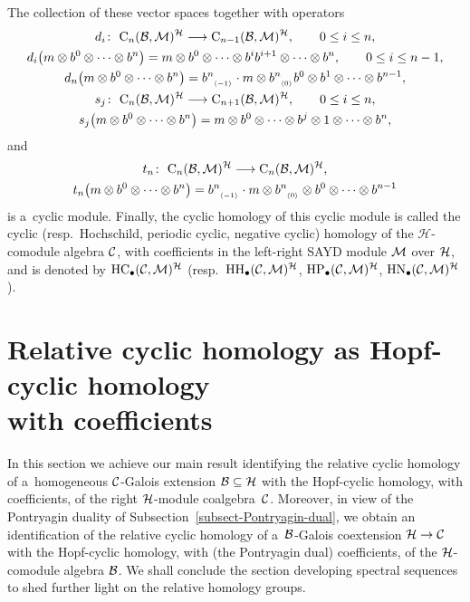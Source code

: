 \documentclass[pdftex]{sigma}
\numberwithin{equation}{section}
\newcommand{\ns}[1]{~\hspace{-4pt}_{_{{\langle#1\rangle}}}}
\begin{document}
The collection of these vector spaces together with operators
\begin{gather*}
d_i\colon \ {\rm C}_n({\cal B},{\cal M})^{{\cal H}} \longrightarrow {\rm C}_{n-1}({\cal B},{\cal M})^{{\cal H}},
\qquad
0 \leq i \leq n,
\\
d_i\big(m\otimes b^0 \otimes \cdots \otimes b^n\big) =m\otimes b^0 \otimes \cdots \otimes b^ib^{i+1}\otimes \cdots \otimes b^n,
\qquad
0 \leq i \leq n-1,
\\
d_n\big(m\otimes b^0 \otimes \cdots \otimes b^n\big) =b^n\ns{-1}\cdot m\otimes b^n\ns{0}b^0\otimes b^1 \otimes \cdots \otimes b^{n-1},
\\
s_j\colon \ {\rm C}_n({\cal B},{\cal M})^{{\cal H}} \longrightarrow {\rm C}_{n+1}({\cal B},{\cal M})^{{\cal H}},
\qquad
0 \leq i \leq n,
\\
s_j\big(m\otimes b^0 \otimes \cdots \otimes b^n\big) =m\otimes b^0 \otimes\cdots \otimes b^j\otimes 1\otimes\cdots \otimes b^n,
\end{gather*}
and
\begin{gather*}
t_n\colon \ {\rm C}_n({\cal B},{\cal M})^{{\cal H}} \longrightarrow {\rm C}_n({\cal B},{\cal M})^{{\cal H}},
\\
t_n\big(m\otimes b^0 \otimes \cdots \otimes b^n\big) =b^n\ns{-1}\cdot m\otimes b^n\ns{0}\otimes b^0\otimes \cdots \otimes b^{n-1}
\end{gather*}
is a~cyclic module.
Finally, the cyclic homology of this cyclic module is called the cyclic (resp.\
Hochschild, periodic cyclic, negative cyclic) homology of the $\mathcal{H}$-comodule algebra ${\cal C}$, with
coef\/f\/icients in the left-right SAYD module ${\cal M}$ over ${\cal H}$, and is denoted by ${\rm HC}_\bullet({\cal
C},{\cal M})^{\cal H}$ (resp.\
${\rm HH}_\bullet({\cal C},{\cal M})^{\cal H}$, ${\rm HP}_\bullet({\cal C},{\cal M})^{\cal H}$, ${\rm HN}_\bullet({\cal
C},{\cal M})^{\cal H}$).

\section{Relative cyclic homology as Hopf-cyclic homology\\ with coef\/f\/icients}

In this section we achieve our main result identifying the relative cyclic homology of a~homogeneous ${\cal C}$-Galois
extension ${\cal B}\subseteq{\cal H}$ with the Hopf-cyclic homology, with coef\/f\/icients, of the right ${\cal H}$-module
coalgebra~${\cal C}$.
Moreover, in view of the Pontryagin duality of Subsection~\ref{subsect-Pontryagin-dual}, we obtain an identif\/ication of
the relative cyclic homology of a~${\cal B}$-Galois coextension ${\cal H}\to {\cal C}$ with the Hopf-cyclic homology,
with (the Pontryagin dual) coef\/f\/icients, of the ${\cal H}$-comodule algebra ${\cal B}$.
We shall conclude the section developing spectral sequences to shed further light on the relative homology groups.
\end{document}

